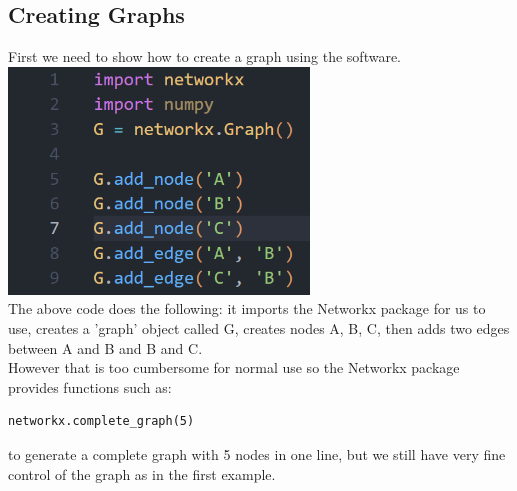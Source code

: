 \documentclass{article}
\begin{document}
        \subsection{Creating Graphs}
        First we need to show how to create a graph using the software.\\
        \includegraphics[width=8cm]{images/add_nodes_add_edges.png}\\
        The above code does the following: it imports the Networkx package for us to use, creates a 'graph' object called G, creates nodes A, B, C, then adds two edges between A and B and B and C.\\
        However that is too cumbersome for normal use so the Networkx package provides functions such as:
        \begin{verbatim}networkx.complete_graph(5)\end{verbatim}
        to generate a complete graph with 5 nodes in one line, but we still have very fine control of the graph as in the first example.
\end{document}
